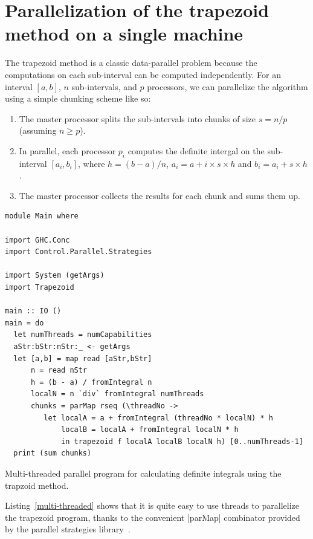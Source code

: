 \documentclass{tmr}
\begin{document}
\section{Parallelization of the trapezoid method on a single machine}

The trapezoid method is a classic data-parallel problem because
the computations on each sub-interval can be computed independently.
For an interval $[a,b]$, $n$ sub-intervals, and $p$ processors, we can parallelize
the algorithm using a simple chunking scheme like so:
\begin{enumerate}
   \item The master processor splits the sub-intervals into chunks of size $s = n/p$ (assuming $n \ge p$).
   \item In parallel, each processor $p_i$ computes the definite intergal on the sub-interval 
         $[a_i, b_i]$, where $h = (b - a)/n$, $a_i = a + i \times s \times h$ and
         $b_i = a_i + s \times h$.
   \item The master processor collects the results for each chunk and sums them up.
\end{enumerate}

\begin{listing}
\begin{Verbatim}
module Main where

import GHC.Conc
import Control.Parallel.Strategies

import System (getArgs)
import Trapezoid

main :: IO ()
main = do
  let numThreads = numCapabilities
  aStr:bStr:nStr:_ <- getArgs
  let [a,b] = map read [aStr,bStr]
      n = read nStr
      h = (b - a) / fromIntegral n
      localN = n `div` fromIntegral numThreads
      chunks = parMap rseq (\threadNo ->
         let localA = a + fromIntegral (threadNo * localN) * h
             localB = localA + fromIntegral localN * h
             in trapezoid f localA localB localN h) [0..numThreads-1]
  print (sum chunks)
\end{Verbatim}
\caption{Multi-threaded parallel program for calculating definite integrals using the trapzoid method. \label{multi-threaded}}
\end{listing}

Listing~\ref{multi-threaded} shows that it is quite easy to use threads to
parallelize the trapezoid program, thanks to the convenient |parMap| combinator provided by the
parallel strategies library~\cite{parallel_library}.
\end{document}
